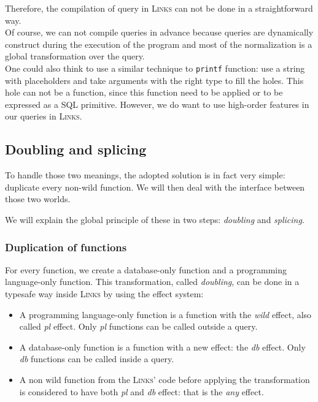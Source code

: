 \documentclass[11pt]{article}
\newcommand\mysc[1]{{\rmfamily\textsc{#1}}\xspace}
\newcommand\links{\mysc{Links}}
\newcommand\sql{\mysc{SQL}}
\newcommand\code[1]{{\tt #1}}
\newcommand\effect[1]{{\em #1}}
\begin{document}
Therefore, the compilation of query in \links can not be done in a straightforward way.\\

Of course, we can not compile queries in advance because queries are dynamically construct during the execution of the program and most of the normalization is a global transformation over the query.\\

One could also think to use a similar technique to \code{printf} function: use a string with placeholders and take arguments with the right type to fill the holes. This hole can not be a function, since this function need to be applied or to be expressed as a \sql primitive. However, we do want to use high-order features in our queries in \links.

\subsection{Doubling and splicing}

To handle those two meanings, the adopted solution is in fact very simple: duplicate every non-wild function. We will then deal with the interface between those two worlds.

We will explain the global principle of these in two steps: \emph{doubling} and \emph{splicing}.

\subsubsection{Duplication of functions}

For every function, we create a database-only function and a programming language-only function. This transformation, called \emph{doubling}, can be done in a typesafe way inside \links by using the effect system: 
\begin{itemize}
\item A programming language-only function is a function with the \effect{wild} effect, also called \effect{pl} effect. Only \effect{pl} functions can be called outside a query.
\item A database-only function is a function with a new effect: the \effect{db} effect. Only \effect{db} functions can be called inside a query.
\item A non wild function from the \links' code before applying the transformation is considered to have both \effect{pl} and \effect{db} effect: that is the \effect{any} effect.
\end{itemize}
\end{document}
